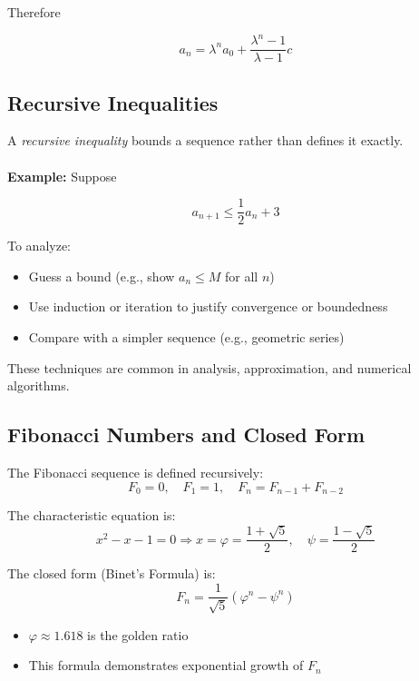 Therefore

\[a_n = \lambda^n a_0 + \frac{\lambda^n - 1}{\lambda - 1}c\]

\subsection{Recursive Inequalities}

A \emph{recursive inequality} bounds a sequence rather than defines it exactly.
\\\\
\textbf{Example:} Suppose

\[
a_{n+1} \le \frac{1}{2} a_n + 3
\]

To analyze:
\begin{itemize}[label=\(-\)]
    \item Guess a bound (e.g., show \( a_n \le M \) for all \( n \))
    \item Use induction or iteration to justify convergence or boundedness
    \item Compare with a simpler sequence (e.g., geometric series)
\end{itemize}

These techniques are common in analysis, approximation, and numerical algorithms.

\subsection{Fibonacci Numbers and Closed Form}

The Fibonacci sequence is defined recursively:
\[
F_0 = 0, \quad F_1 = 1, \quad F_n = F_{n-1} + F_{n-2}
\]

The characteristic equation is:
\[
x^2 - x - 1 = 0 \Rightarrow x = \varphi = \frac{1 + \sqrt{5}}{2}, \quad \psi = \frac{1 - \sqrt{5}}{2}
\]

The closed form (Binet’s Formula) is:
\[
F_n = \frac{1}{\sqrt{5}} \left( \varphi^n - \psi^n \right)
\]

\begin{itemize}[label=\(-\)]
    \item \( \varphi \approx 1.618 \) is the golden ratio
    \item This formula demonstrates exponential growth of \( F_n \)
\end{itemize}

